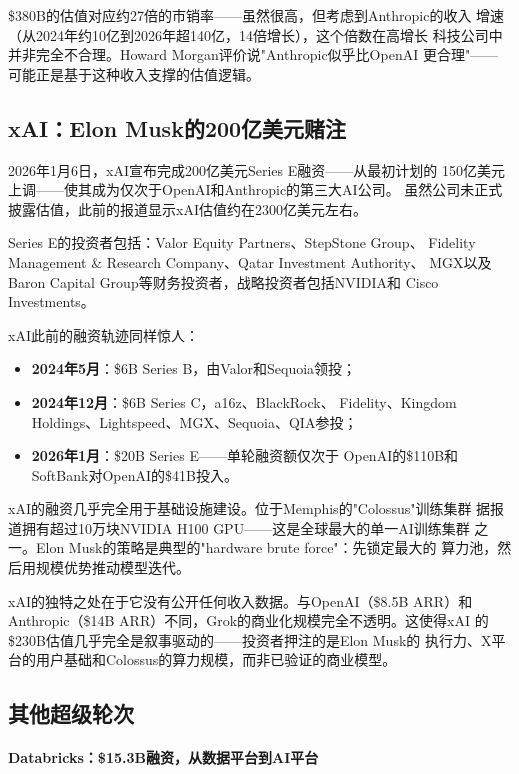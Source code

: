 \$380B的估值对应约27倍的市销率——虽然很高，但考虑到Anthropic的收入
增速（从2024年约10亿到2026年超140亿，14倍增长），这个倍数在高增长
科技公司中并非完全不合理。Howard Morgan评价说"Anthropic似乎比OpenAI
更合理"——可能正是基于这种收入支撑的估值逻辑。

\subsection{xAI：Elon Musk的200亿美元赌注}
\label{subsec:fund-xai-mega}

2026年1月6日，xAI宣布完成200亿美元Series E融资——从最初计划的
150亿美元上调——使其成为仅次于OpenAI和Anthropic的第三大AI公司。
虽然公司未正式披露估值，此前的报道显示xAI估值约在2300亿美元左右。

Series E的投资者包括：Valor Equity Partners、StepStone Group、
Fidelity Management \& Research Company、Qatar Investment Authority、
MGX以及Baron Capital Group等财务投资者，战略投资者包括NVIDIA和
Cisco Investments。

xAI此前的融资轨迹同样惊人：
\begin{itemize}
  \item \textbf{2024年5月}：\$6B Series B，由Valor和Sequoia领投；
  \item \textbf{2024年12月}：\$6B Series C，a16z、BlackRock、
    Fidelity、Kingdom Holdings、Lightspeed、MGX、Sequoia、QIA参投；
  \item \textbf{2026年1月}：\$20B Series E——单轮融资额仅次于
    OpenAI的\$110B和SoftBank对OpenAI的\$41B投入。
\end{itemize}

xAI的融资几乎完全用于基础设施建设。位于Memphis的"Colossus"训练集群
据报道拥有超过10万块NVIDIA H100 GPU——这是全球最大的单一AI训练集群
之一。Elon Musk的策略是典型的"hardware brute force"：先锁定最大的
算力池，然后用规模优势推动模型迭代。

xAI的独特之处在于它没有公开任何收入数据。与OpenAI（\$8.5B ARR）和
Anthropic（\$14B ARR）不同，Grok的商业化规模完全不透明。这使得xAI
的\$230B估值几乎完全是叙事驱动的——投资者押注的是Elon Musk的
执行力、X平台的用户基础和Colossus的算力规模，而非已验证的商业模型。

\subsection{其他超级轮次}
\label{subsec:fund-other-megarounds}

\paragraph{Databricks：\$15.3B融资，从数据平台到AI平台}

